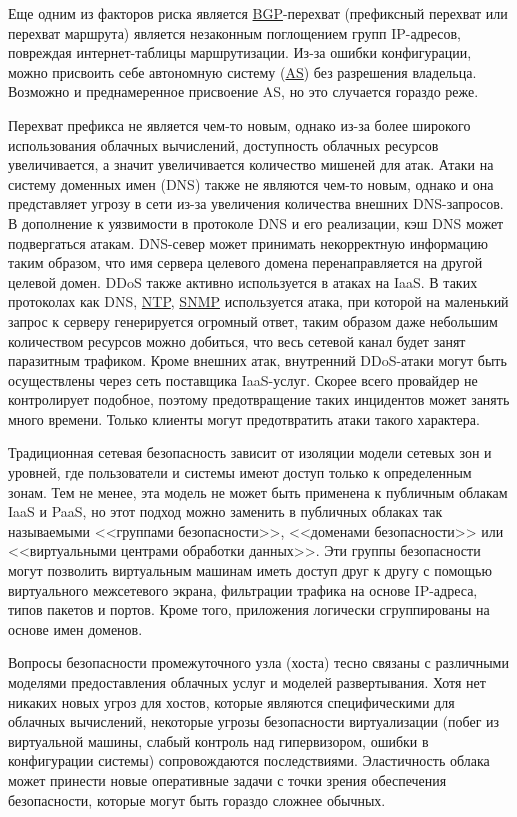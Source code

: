 Еще одним из факторов риска является \hyperlink{bgp}{BGP}-перехват (префиксный перехват или перехват маршрута) является незаконным поглощением групп IP-адресов, повреждая интернет-таблицы маршрутизации.
Из-за ошибки конфигурации, можно присвоить себе автономную систему (\hyperlink{as}{AS}) без разрешения владельца.
Возможно и преднамеренное присвоение AS, но это случается гораздо реже.

Перехват префикса не является чем-то новым, однако из-за более широкого использования облачных вычислений, доступность облачных ресурсов увеличивается, а значит увеличивается количество мишеней для атак.
Атаки на систему доменных имен (DNS) также не являются чем-то новым, однако и она представляет угрозу в сети из-за увеличения количества внешних DNS-запросов.
В дополнение к уязвимости в протоколе DNS и его реализации, кэш DNS может подвергаться атакам.
DNS-север может принимать некорректную информацию таким образом, что имя сервера целевого домена перенаправляется на другой целевой домен.
DDoS также активно используется в атаках на IaaS.
В таких протоколах как DNS, \hyperlink{ntp}{NTP}, \hyperlink{snmp}{SNMP} используется атака, при которой на маленький запрос к серверу генерируется огромный ответ, таким образом даже небольшим количеством ресурсов можно добиться, что весь сетевой канал будет занят паразитным трафиком.
Кроме внешних атак, внутренний DDoS-атаки могут быть осуществлены через сеть поставщика IaaS-услуг.
Скорее всего провайдер не контролирует подобное, поэтому предотвращение таких инцидентов может занять много времени.
Только клиенты могут предотвратить атаки такого характера.

Традиционная сетевая безопасность зависит от изоляции модели сетевых зон и уровней, где пользователи и системы имеют доступ только к определенным зонам.
Тем не менее, эта модель не может быть применена к публичным облакам IaaS и PaaS, но этот подход можно заменить в публичных облаках так называемыми <<группами безопасности>>, <<доменами безопасности>> или <<виртуальными центрами обработки данных>>.
Эти группы безопасности могут позволить виртуальным машинам иметь доступ друг к другу с помощью виртуального межсетевого экрана, фильтрации трафика на основе IP-адреса, типов пакетов и портов.
Кроме того, приложения логически сгруппированы на основе имен доменов.

Вопросы безопасности промежуточного узла (хоста) тесно связаны с различными моделями предоставления облачных услуг и моделей развертывания.
Хотя нет никаких новых угроз для хостов, которые являются специфическими для облачных вычислений, некоторые угрозы безопасности виртуализации (побег из виртуальной машины, слабый контроль над гипервизором, ошибки в конфигурации системы) сопровождаются последствиями.
Эластичность облака может принести новые оперативные задачи с точки зрения обеспечения безопасности, которые могут быть гораздо сложнее обычных.

